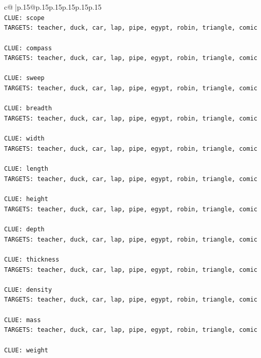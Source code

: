 \documentclass{article}
\begin{document}
{\begin{supertabular}{c@{$\;$}|p{.15\linewidth}@{}p{.15\linewidth}p{.15\linewidth}p{.15\linewidth}p{.15\linewidth}p{.15\linewidth}}
{{{\\ 
\texttt{CLUE: scope} \\
\texttt{TARGETS: teacher, duck, car, lap, pipe, egypt, robin, triangle, comic} \\
\\ 
\texttt{CLUE: compass} \\
\texttt{TARGETS: teacher, duck, car, lap, pipe, egypt, robin, triangle, comic} \\
\\ 
\texttt{CLUE: sweep} \\
\texttt{TARGETS: teacher, duck, car, lap, pipe, egypt, robin, triangle, comic} \\
\\ 
\texttt{CLUE: breadth} \\
\texttt{TARGETS: teacher, duck, car, lap, pipe, egypt, robin, triangle, comic} \\
\\ 
\texttt{CLUE: width} \\
\texttt{TARGETS: teacher, duck, car, lap, pipe, egypt, robin, triangle, comic} \\
\\ 
\texttt{CLUE: length} \\
\texttt{TARGETS: teacher, duck, car, lap, pipe, egypt, robin, triangle, comic} \\
\\ 
\texttt{CLUE: height} \\
\texttt{TARGETS: teacher, duck, car, lap, pipe, egypt, robin, triangle, comic} \\
\\ 
\texttt{CLUE: depth} \\
\texttt{TARGETS: teacher, duck, car, lap, pipe, egypt, robin, triangle, comic} \\
\\ 
\texttt{CLUE: thickness} \\
\texttt{TARGETS: teacher, duck, car, lap, pipe, egypt, robin, triangle, comic} \\
\\ 
\texttt{CLUE: density} \\
\texttt{TARGETS: teacher, duck, car, lap, pipe, egypt, robin, triangle, comic} \\
\\ 
\texttt{CLUE: mass} \\
\texttt{TARGETS: teacher, duck, car, lap, pipe, egypt, robin, triangle, comic} \\
\\ 
\texttt{CLUE: weight} \\
}}}
\end{supertabular}}
\end{document}
